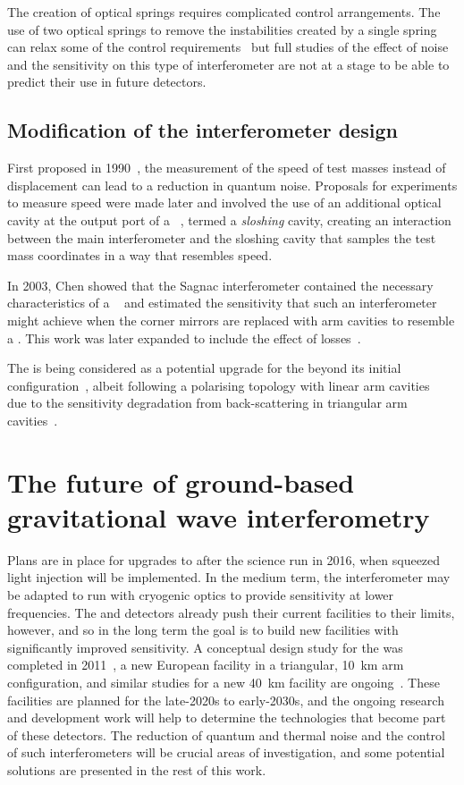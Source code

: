 The creation of optical springs requires complicated control arrangements. The use of two optical springs to remove the instabilities created by a single spring can relax some of the control requirements~\cite{Rehbein2008} but full studies of the effect of noise and the sensitivity on this type of interferometer are not at a stage to be able to predict their use in future detectors.

\subsection{Modification of the interferometer design}
First proposed in 1990~\cite{Braginsky1990}, the measurement of the speed of test masses instead of displacement can lead to a reduction in quantum noise. Proposals for experiments to measure speed were made later and involved the use of an additional optical cavity at the output port of a \MI{}~\cite{Braginsky2000, Purdue2002}, termed a \emph{sloshing} cavity, creating an interaction between the main interferometer and the sloshing cavity that samples the test mass coordinates in a way that resembles speed.

In 2003, Chen showed that the Sagnac interferometer contained the necessary characteristics of a \SM{}~\cite{Chen2003} and estimated the sensitivity that such an interferometer might achieve when the corner mirrors are replaced with arm cavities to resemble a \FPMI{}. This work was later expanded to include the effect of losses~\cite{Danilishin2004, Danilishin2015}.

The \SSM{} is being considered as a potential upgrade for the \ET{} beyond its initial configuration~\cite{Wang2013, Huttner2016}, albeit following a polarising topology with linear arm cavities~\cite{Danilishin2004} due to the sensitivity degradation from back-scattering in triangular arm cavities~\cite{Pascucci2016}.

\section{The future of ground-based gravitational wave interferometry}
Plans are in place for upgrades to \ALIGO{} after the science run in 2016, when squeezed light injection will be implemented. In the medium term, the interferometer may be adapted to run with cryogenic optics to provide sensitivity at lower frequencies. The \ALIGO{} and \AVIRGO{} detectors already push their current facilities to their limits, however, and so in the long term the goal is to build new facilities with significantly improved sensitivity. A conceptual design study for the \ET{} was completed in 2011~\cite{ET2011}, a new European facility in a triangular, \SI{10}{\kilo\meter} arm configuration, and similar studies for a new \SI{40}{\kilo\meter} \LIGO{} facility are ongoing~\cite{Dwyer2015, aligocosmic2016}. These facilities are planned for the late-2020s to early-2030s, and the ongoing research and development work will help to determine the technologies that become part of these detectors. The reduction of quantum and thermal noise and the control of such interferometers will be crucial areas of investigation, and some potential solutions are presented in the rest of this work.